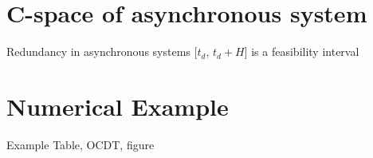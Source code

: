 \documentclass{beamer}
\begin{document}
\section{C-space of asynchronous system}

	\begin{frame}{Redundancy in asynchronous systems}
		[$t_d$, $t_d + H$] is a feasibility interval
	\end{frame}

\section{Numerical Example}

	\begin{frame}{Example}
		Table, OCDT, figure
	\end{frame}
\end{document}
